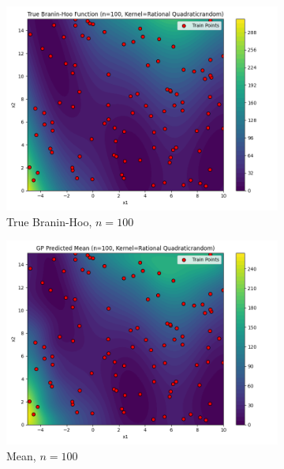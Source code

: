 \documentclass[a4paper,12pt]{article}
\begin{document}
\begin{figure}[H]
\begin{subfigure}{0.3\textwidth}
  \includegraphics[width=\linewidth]{Task-02/images/true_function_rational_quadratic_n100_random.png}
  \caption{True Branin-Hoo, $n=100$}
\end{subfigure}
\begin{subfigure}{0.3\textwidth}
    \includegraphics[width=\linewidth]{Task-02/images/gp_mean_rational_quadratic_n100_random.png}
    \caption{Mean, $n=100$}
\end{subfigure}
\begin{subfigure}{0.3\textwidth}

\end{subfigure}
\end{figure}
\end{document}
